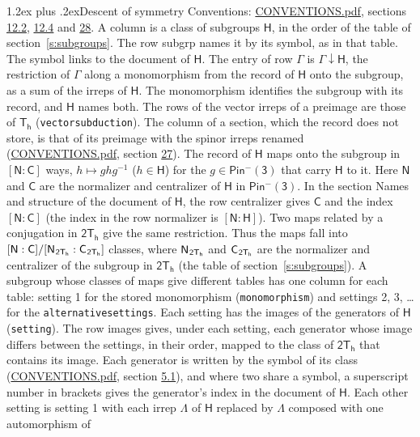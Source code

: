 \documentclass[10pt,a4paper]{article}
\makeatletter
\renewcommand\section{\@startsection{section}{1}{\z@}{-3ex plus -1ex minus -.2ex}%
  {1.2ex plus .2ex}{\normalfont\large\sffamily\bfseries\color{parttitle}}}
\numberwithin{equation}{section}
\newcommand{\grp}[1]{\mathsf{#1}}
\newcommand{\grpindex}[2]{[#1 : #2]}
\newcommand{\restr}[2]{#1\!\downarrow#2}
\newcommand{\hairsp}{\mkern1mu}
\makeatother
\begin{document}
\section{Descent of symmetry}\label{s:subduction}
Conventions: \href{../../CONVENTIONS.pdf}{CONVENTIONS.pdf}, sections \href{../../../rotation/CONVENTIONS.pdf\#conv.12.2}{12.2}, \href{../../../rotation/CONVENTIONS.pdf\#conv.12.4}{12.4} and \href{../../CONVENTIONS.pdf\#conv.28}{28}.
A column is a class of subgroups $\grp{H}$, in the order of the table of section~\ref{s:subgroups}. The row subgrp names it by its symbol, as in that table. The symbol links to the document of $\grp{H}$. The entry of row $\Gamma$ is $\restr{\Gamma}{\grp{H}}$, the restriction of $\Gamma$ along a monomorphism from the record of $\grp{H}$ onto the subgroup, as a sum of the irreps of $\grp{H}$. The monomorphism identifies the subgroup with its record, and $\grp{H}$ names both. The rows of the vector irreps of a preimage are those of \href{../../../rotation/data/pdf/Th.pdf}{$\grp{T_{h}}$} (\texttt{vectorsubduction}). The column of a section, which the record does not store, is that of its preimage with the spinor irreps renamed (\href{../../CONVENTIONS.pdf}{CONVENTIONS.pdf}, section \href{../../CONVENTIONS.pdf\#conv.27}{27}). \label{n:group.normalizer.o3}\label{n:group.centralizer.o3}\label{n:element.h}The record of $\grp{H}$ maps onto the subgroup in $\grpindex{\grp{N}}{\grp{C}}$ ways, $h \mapsto g h g^{-1}$ ($h \in \grp{H}$) for the $g \in \grp{Pin^{-}(3)}$ that carry $\grp{H}$ to it. Here $\grp{N}$ and $\grp{C}$ are the normalizer and centralizer of $\grp{H}$ in \href{Pinminus3.pdf}{$\grp{Pin^{-}(3)}$}. In the section Names and structure of the document of $\grp{H}$, the row centralizer gives $\grp{C}$ and the index $\grpindex{\grp{N}}{\grp{C}}$ (the index in the row normalizer is $\grpindex{\grp{N}}{\grp{H}}$). Two maps related by a conjugation in $\grp{2T_{h}}$ give the same restriction. Thus the maps fall into $\grpindex{\grp{N}}{\grp{C}}/\grpindex{\grp{N}_{\hairsp \grp{2T_{h}}}}{\grp{C}_{\hairsp \grp{2T_{h}}}}$ classes, where $\grp{N}_{\hairsp \grp{2T_{h}}}$ and $\grp{C}_{\hairsp \grp{2T_{h}}}$ are the normalizer and centralizer of the subgroup in $\grp{2T_{h}}$ (the table of section~\ref{s:subgroups}). \label{n:head.setting}A subgroup whose classes of maps give different tables has one column for each table: setting 1 for the stored monomorphism (\texttt{monomorphism}) and settings 2, 3, \dots{} for the \texttt{alternativesettings}. Each setting has the images of the generators of $\grp{H}$ (\texttt{setting}). \label{n:head.images}The row images gives, under each setting, each generator whose image differs between the settings, in their order, mapped to the class of $\grp{2T_{h}}$ that contains its image. \label{n:element.generator.index}Each generator is written by the symbol of its class (\href{../../CONVENTIONS.pdf}{CONVENTIONS.pdf}, section \href{../../../rotation/CONVENTIONS.pdf\#conv.5.1}{5.1}), and where two share a symbol, a superscript number in brackets gives the generator's index in the document of $\grp{H}$. \label{n:irrep.Delta}Each other setting is setting 1 with each irrep $\Lambda$ of $\grp{H}$ replaced by $\Lambda$ composed with one automorphism of 
\end{document}
